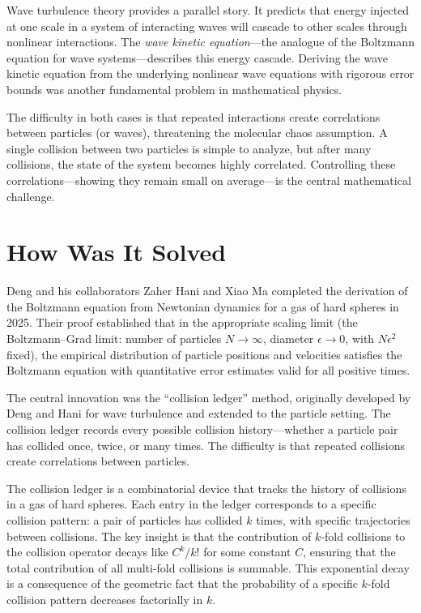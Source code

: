 Wave turbulence theory provides a parallel story. It predicts that energy injected at one scale in a system of interacting waves will cascade to other scales through nonlinear interactions. The \emph{wave kinetic equation}---the analogue of the Boltzmann equation for wave systems---describes this energy cascade. Deriving the wave kinetic equation from the underlying nonlinear wave equations with rigorous error bounds was another fundamental problem in mathematical physics.

The difficulty in both cases is that repeated interactions create correlations between particles (or waves), threatening the molecular chaos assumption. A single collision between two particles is simple to analyze, but after many collisions, the state of the system becomes highly correlated. Controlling these correlations---showing they remain small on average---is the central mathematical challenge.

\section{How Was It Solved}

Deng and his collaborators Zaher Hani and Xiao Ma completed the derivation of the Boltzmann equation from Newtonian dynamics for a gas of hard spheres in 2025. Their proof established that in the appropriate scaling limit (the Boltzmann--Grad limit: number of particles $N\to\infty$, diameter $\epsilon\to 0$, with $N\epsilon^2$ fixed), the empirical distribution of particle positions and velocities satisfies the Boltzmann equation with quantitative error estimates valid for all positive times.

The central innovation was the ``collision ledger'' method, originally developed by Deng and Hani for wave turbulence and extended to the particle setting. The collision ledger records every possible collision history---whether a particle pair has collided once, twice, or many times. The difficulty is that repeated collisions create correlations between particles.

The collision ledger is a combinatorial device that tracks the history of collisions in a gas of hard spheres. Each entry in the ledger corresponds to a specific collision pattern: a pair of particles has collided $k$ times, with specific trajectories between collisions. The key insight is that the contribution of $k$-fold collisions to the collision operator decays like $C^k/k!$ for some constant $C$, ensuring that the total contribution of all multi-fold collisions is summable. This exponential decay is a consequence of the geometric fact that the probability of a specific $k$-fold collision pattern decreases factorially in $k$.

